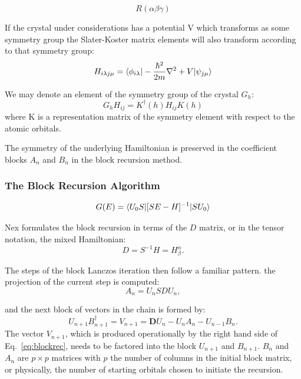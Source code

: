 \begin{equation}
R(\alpha\beta\gamma)
\end{equation}

If the crystal under considerations has a potential V which transforms as some symmetry group
the Slater-Koster matrix elements will also transform according to that symmetry group:
%
\begin{equation}
H_{i\lambda j\mu} = \langle \phi_{i\lambda} | -\frac{\hbar^{2}}{2m}\nabla^{2} + V|\psi_{j\mu} \rangle
\end{equation}
%

We may denote an element of the symmetry group of the crystal $G_{h}$:
%
\begin{equation}
G_{h} H_{ij} =  K^{\dagger}(h)H_{ij}K(h)
\end{equation}
%
where K is a representation matrix of the symmetry element 
with respect to the atomic orbitals. 

The symmetry of the underlying Hamiltonian is preserved in the coefficient
blocks $A_{n}$ and $B_{n}$\cite{inoue87} in the block recursion method.
\subsubsection{The Block Recursion Algorithm}
\label{sec:blockrecursion}

\begin{equation}
G(E) = \langle U_{0}S|[SE-H]^{-1}|SU_{0}\rangle
\end{equation}

Nex formulates the block recursion in terms of the 
$D$ matrix, or in the tensor notation, the mixed Hamiltonian:
%
\begin{equation}
D = S^{-1}H = H^{\alpha} _{\beta}.
\end{equation}
%

The steps of the block Lanczos iteration then follow a familiar pattern.
the projection of the current step is computed:
%
\begin{equation}
A_{n} = U_{n}SDU_{n},
\end{equation}

and the next block of vectors in the chain is formed by: 
%
\begin{equation}
\label{eq:blockrec}
U_{n+1}B^{\dagger}_{n+1} = V_{n+1} = \mathbf{D}U_{n} - U_{n}A_{n} - U_{n-1}B_{n}.
\end{equation}
%
The vector $V_{n+1}$, which is produced operationally by the right hand
side of Eq.~\ref{eq:blockrec}, needs to be factored into the block
$U_{n+1}$ and $B_{n+1}$. $B_{n}$ and $A_{n}$ are $p\times p$ 
matrices with $p$ the number of columns in the initial block matrix, or
physically, the number of starting orbitals chosen to
initiate the recursion. 

